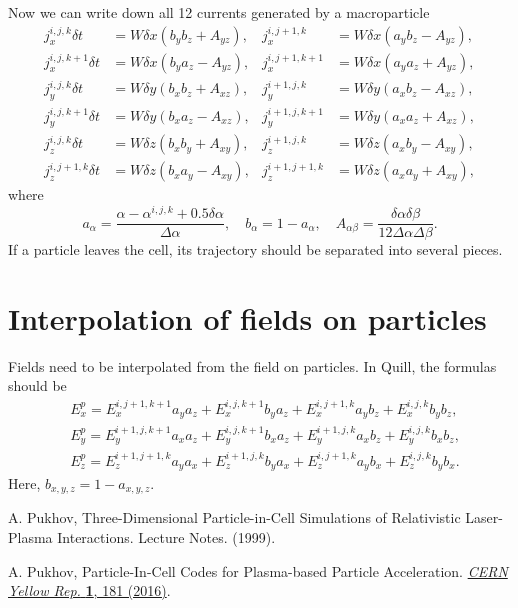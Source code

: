 \documentclass[12pt,a4paper,DIV=calc]{scrartcl}
\begin{document}
Now we can write down all 12 currents generated by a macroparticle
\begin{equation}
\begin{aligned}
    j_x^{i,j,k} \delta t &= W \delta x (b_y b_z + A_{yz}), & j_x^{i,j+1,k} &= W \delta x (a_y b_z - A_{yz}),\\
    j_x^{i,j,k+1} \delta t &= W \delta x(b_y a_z - A_{yz}), & j_x^{i,j+1,k+1} &= W \delta x(a_y a_z + A_{yz}),\\
    j_y^{i,j,k} \delta t &= W \delta y (b_x b_z + A_{xz}), & j_y^{i+1,j,k} &= W \delta y (a_x b_z - A_{xz}),\\
    j_y^{i,j,k+1} \delta t &= W \delta y (b_x a_z - A_{xz}), & j_y^{i+1,j,k+1} &= W \delta y (a_x a_z + A_{xz}),\\
    j_z^{i,j,k} \delta t &= W \delta z (b_x b_y + A_{xy}), & j_z^{i+1,j,k} &= W \delta z (a_x b_y - A_{xy}),\\
    j_z^{i,j+1,k} \delta t &= W \delta z(b_x a_y - A_{xy}), & j_z^{i+1,j+1,k} &= W \delta z(a_x a_y + A_{xy}),
\end{aligned}
\end{equation}
where
\begin{equation}
    a_\alpha = \frac{\alpha - \alpha^{i,j,k} + 0.5 \delta \alpha}{\Delta \alpha},
    \quad b_\alpha = 1 - a_\alpha,
    \quad A_{\alpha \beta} = \frac{\delta\alpha \delta\beta}{12\Delta\alpha\Delta\beta}.
\end{equation}
If a particle leaves the cell, its trajectory should be separated into several pieces.

\section{Interpolation of fields on particles}
Fields need to be interpolated from the field on particles.
In Quill, the formulas should be
\begin{align}
    &E_x^p = E_x^{i,j+1,k+1} a_y a_z + E_x^{i,j,k+1} b_y a_z + E_x^{i,j+1,k} a_y b_z + E_x^{i,j,k} b_y b_z,\\
    &E_y^p = E_y^{i+1,j,k+1} a_x a_z + E_y^{i,j,k+1} b_x a_z + E_y^{i+1,j,k} a_x b_z + E_y^{i,j,k} b_x b_z,\\
    &E_z^p = E_z^{i+1,j+1,k} a_y a_x + E_z^{i+1,j,k} b_y a_x + E_z^{i,j+1,k} a_y b_x + E_z^{i,j,k} b_y b_x.
\end{align}
Here, $b_{x,y,z} = 1 - a_{x,y,z}$.

\begin{thebibliography}{9}
    A. Pukhov, Three-Dimensional Particle-in-Cell Simulations of Relativistic Laser-Plasma Interactions. Lecture Notes. (1999).
    
    A. Pukhov, Particle-In-Cell Codes for Plasma-based Particle Acceleration. \href{https://e-publishing.cern.ch/index.php/CYR/article/view/220}{\textit{CERN Yellow Rep.} \textbf{1}, 181 (2016)}.
\end{thebibliography}
\end{document}
